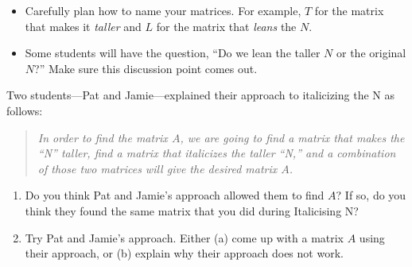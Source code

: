 \begin{iola}
\begin{annotation}
		\begin{notes}
			\begin{itemize}
				\item Carefully plan how to name your matrices. For example, $T$ for 
					the matrix that makes it \emph{taller} and $L$ for the matrix
					that \emph{leans} the $N$.
				\item Some students will have the question, ``Do we lean the taller $N$ or the original $N$?''
					Make sure this discussion point comes out.
					
			\end{itemize}
		\end{notes}
	\end{annotation}

Two students---Pat and Jamie---explained their approach to italicizing the N as follows:
\begin{quote}\itshape
	In order to find the matrix $A$, we are going to find a matrix that makes the ``N'' taller,
	find a matrix that italicizes the taller ``N,'' and a combination of those two matrices
	will give the desired matrix $A$.
\end{quote}

\begin{enumerate}
	\item Do you think Pat and Jamie's approach allowed them to find $A$?  If so, do
		you think they found the same matrix that you did during Italicising N?
	\item Try Pat and Jamie's approach.  Either (a) come up with a matrix $A$ using
		their approach, or (b) explain why their approach does not work.
\end{enumerate}

\end{iola}

